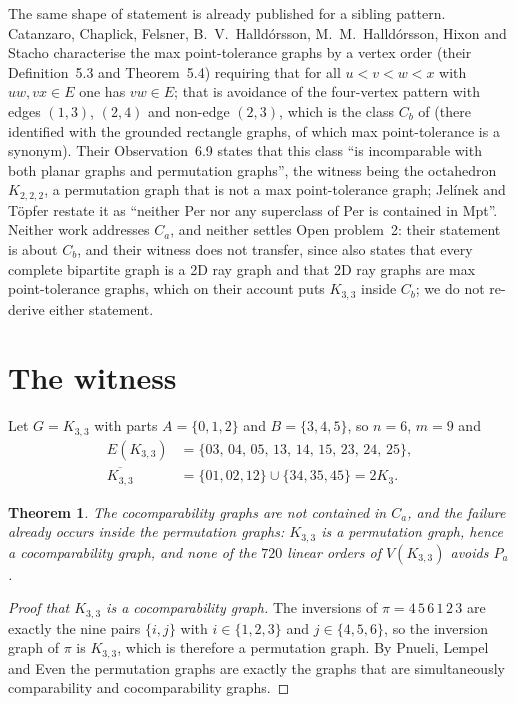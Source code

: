 \documentclass[11pt]{amsart}
\newtheorem{theorem}{Theorem}
\theoremstyle{remark}
\newcommand{\Ca}{C_a}
\newcommand{\Pa}{P_a}
\begin{document}
The same shape of statement is already published for a sibling pattern.
Catanzaro, Chaplick, Felsner, B.~V.~Halld\'orsson, M.~M.~Halld\'orsson, Hixon and
Stacho \cite{MPT} characterise the max point-tolerance graphs by a vertex order
(their Definition~5.3 and Theorem~5.4) requiring that for all $u<v<w<x$ with
$uw,vx\in E$ one has $vw\in E$; that is avoidance of the four-vertex pattern with
edges $(1,3)$, $(2,4)$ and non-edge $(2,3)$, which is the class $C_b$ of \cite{FH}
(there identified with the grounded rectangle graphs, of which max point-tolerance
is a synonym). Their Observation~6.9 states that this class ``is incomparable with
both planar graphs and permutation graphs'', the witness being the octahedron
$K_{2,2,2}$, a permutation graph that is not a max point-tolerance graph; Jel\'inek
and T\"opfer \cite{JT} restate it as ``neither Per nor any superclass of Per is
contained in Mpt''. Neither work addresses $\Ca$, and neither settles Open
problem~2: their statement is about $C_b$, and their witness does not transfer,
since \cite{MPT} also states that every complete bipartite graph is a 2D ray graph
and that 2D ray graphs are max point-tolerance graphs, which on their account puts
$K_{3,3}$ inside $C_b$; we do not re-derive either statement.

\section{The witness}

Let $G=K_{3,3}$ with parts $A=\{0,1,2\}$ and $B=\{3,4,5\}$, so $n=6$, $m=9$ and
\begin{align*}
  E(K_{3,3})&=\{03,\,04,\,05,\,13,\,14,\,15,\,23,\,24,\,25\},\\
  \overline{K_{3,3}}&=\{01,02,12\}\cup\{34,35,45\}=2K_3 .
\end{align*}

\begin{theorem}\label{thm:main}
The cocomparability graphs are not contained in $\Ca$, and the failure already
occurs inside the permutation graphs: $K_{3,3}$ is a permutation graph, hence a
cocomparability graph, and none of the $720$ linear orders of $V(K_{3,3})$
avoids $\Pa$.
\end{theorem}

\begin{proof}[Proof that $K_{3,3}$ is a cocomparability graph]
The inversions of $\pi=4\,5\,6\,1\,2\,3$ are exactly the nine pairs $\{i,j\}$ with
$i\in\{1,2,3\}$ and $j\in\{4,5,6\}$, so the inversion graph of $\pi$ is $K_{3,3}$,
which is therefore a permutation graph. By Pnueli, Lempel and Even \cite{PLE} the
permutation graphs are exactly the graphs that are simultaneously comparability and
cocomparability graphs.
\end{proof}
\end{document}
